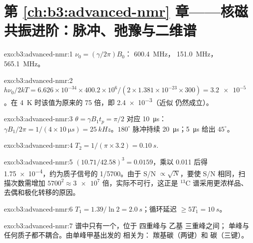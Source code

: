 \section*{第 \ref{ch:b3:advanced-nmr} 章——核磁共振进阶：脉冲、弛豫与二维谱}

\begin{solution}{exo:b3:advanced-nmr:1}
$\nu_0 = (\gamma/2\pi)B_0$： \qty{600.4}{MHz}， \qty{151.0}{MHz}，
\qty{565.1}{MHz}。
\end{solution}

\begin{solution}{exo:b3:advanced-nmr:2}
$h\nu_0/2kT = 6.626\times10^{-34} \times 400.2\times10^6/(2 \times 1.381\times10^{-23} \times 300)
= \num{3.2e-5}$。在 \qty{4}{K} 时该值为原来的 75 倍，即 \num{2.4e-3}（近似
仍然成立）。
\end{solution}

\begin{solution}{exo:b3:advanced-nmr:3}
$\theta = \gamma B_1t_p = \pi/2$ 对应 \qty{10}{\micro s}：$\gamma B_1/2\pi = 1/(4 \times
\qty{10}{\micro s}) = \qty{25}{kHz}$。$180^\circ$ 脉冲持续 \qty{20}{\micro s}；\qty{5}{\micro s}
给出 $45^\circ$。
\end{solution}

\begin{solution}{exo:b3:advanced-nmr:4}
$T_2 = 1/(\pi \times 3.2) = \qty{0.10}{s}$.
\end{solution}

\begin{solution}{exo:b3:advanced-nmr:5}
$(10.71/42.58)^3 = 0.0159$，乘以 0.011 后得 \num{1.75e-4}，约为质子信号的
1/5700。由于 S/N $\propto\sqrt N$，要使 S/N 相同，扫描次数需增加
$5700^2 \approx \num{3e7}$ 倍，实际不可行，这正是 ${}^{13}$C 谱采用更浓样品、
去偶和极化转移的原因。
\end{solution}

\begin{solution}{exo:b3:advanced-nmr:6}
$T_1 = 1.39/\ln2 = \qty{2.0}{s}$；循环延迟 $\ge 5T_1 = \qty{10}{s}$。
\end{solution}

\begin{solution}{exo:b3:advanced-nmr:7}
 谱中只有一个，位于  四重峰与
乙基  三重峰之间； 单峰与任何质子都不耦合。由单峰甲基出发的  相关为：
羰基碳（两键）和  碳（三键）。
\end{solution}

